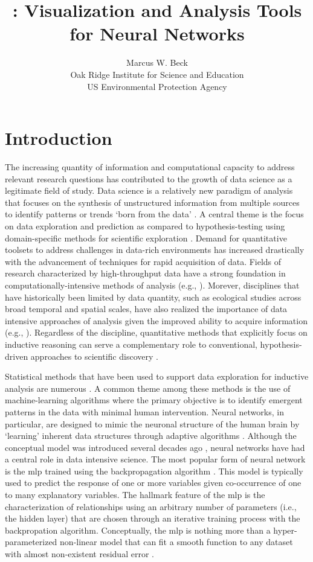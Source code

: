 \documentclass[article]{jss}\usepackage[]{graphicx}\usepackage[]{color}
\author{Marcus W. Beck\\Oak Ridge Institute for Science and Education\\US Environmental Protection Agency}
\title{\pkg{NeuralNetTools}: Visualization and Analysis Tools for Neural Networks}
\begin{document}

\section[Introduction]{Introduction}

The increasing quantity of information and computational capacity to address relevant research questions has contributed to the growth of data science as a legitimate field of study.   Data science is a relatively new paradigm of analysis that focuses on the synthesis of unstructured information from multiple sources to identify patterns or trends `born from the data' \citep{Kelling09}.  A central theme is the focus on data exploration and prediction as compared to hypothesis-testing using domain-specific methods for scientific exploration \citep{Kell03}.  Demand for quantitative toolsets to address challenges in data-rich environments has increased drastically with the advancement of techniques for rapid acquisition of data. Fields of research characterized by high-throughput data have a strong foundation in computationally-intensive methods of analysis (e.g., \citet{Saeys07}).  Morever, disciplines that have historically been limited by data quantity, such as ecological studies across broad temporal and spatial scales, have also realized the importance of data intensive approaches of analysis given the improved ability to acquire information (e.g., \citet{Swanson15}).  Regardless of the discipline, quantitative methods that explicitly focus on inductive reasoning can serve a complementary role to conventional, hypothesis-driven approaches to scientific discovery \citep{Kell03}.  

Statistical methods that have been used to support data exploration for inductive analysis are numerous \citep{Jain00}.  A common theme among these methods is the use of machine-learning algorithms where the primary objective is to identify emergent patterns in the data with minimal human intervention.  Neural networks, in particular, are designed to mimic the neuronal structure of the human brain by `learning' inherent data structures through adaptive algorithms \citep{Rumelhart86,Ripley96}.  Although the conceptual model was introduced several decades ago \citep{McCulloch43}, neural networks have had a central role in data intensive science.  The most popular form of neural network is the \ac{mlp} trained using the backpropagation algorithm \citep{Rumelhart86}.  This model is typically used to predict the response of one or more variables given co-occurrence of one to many explanatory variables.  The hallmark feature of the \ac{mlp} is the characterization of relationships using an arbitrary number of parameters (i.e., the hidden layer) that are chosen through an iterative training process with the backpropation algorithm.  Conceptually, the \ac{mlp} is nothing more than a hyper-parameterized non-linear model that can fit a smooth function to any dataset with almost non-existent residual error \citep{Hornik91}.
\end{document}
